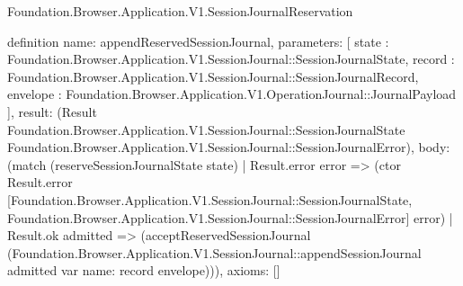 \begin{lexlean}{Foundation.Browser.Application.V1.SessionJournalReservation}
\begin{semanticmodule}
definition{
  name: appendReservedSessionJournal,
  parameters: [
    state : Foundation.Browser.Application.V1.SessionJournal::SessionJournalState,
    record : Foundation.Browser.Application.V1.SessionJournal::SessionJournalRecord,
    envelope : Foundation.Browser.Application.V1.OperationJournal::JournalPayload
  ],
  result: (Result Foundation.Browser.Application.V1.SessionJournal::SessionJournalState Foundation.Browser.Application.V1.SessionJournal::SessionJournalError),
  body: (match (reserveSessionJournalState state)
    | Result.error error => (ctor Result.error [Foundation.Browser.Application.V1.SessionJournal::SessionJournalState, Foundation.Browser.Application.V1.SessionJournal::SessionJournalError] error)
    | Result.ok admitted => (acceptReservedSessionJournal (Foundation.Browser.Application.V1.SessionJournal::appendSessionJournal admitted var{
      name: record
    } envelope))),
  axioms: []
}


\end{semanticmodule}
\end{lexlean}
